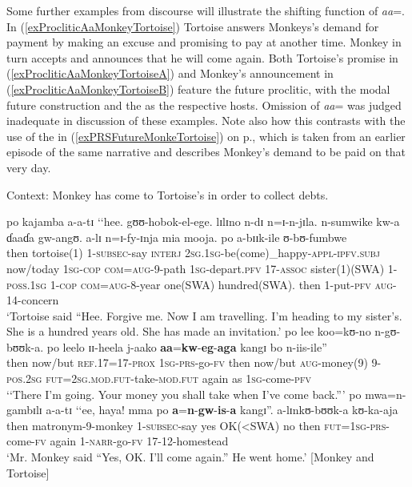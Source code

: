 Some further examples from discourse will illustrate the shifting function of \textit{aa}=. In (\ref{exProcliticAaMonkeyTortoise}) Tortoise answers Monkeys's demand for payment by making an excuse and promising to pay at another time. Monkey in turn accepts and announces that he will come again. Both Tortoise's promise in (\ref{exProcliticAaMonkeyTortoiseA}) and Monkey's announcement in (\ref{exProcliticAaMonkeyTortoiseB}) feature the future proclitic, with the modal future construction and the  as the respective hosts. Omission of \textit{aa}= was judged inadequate in discussion of these examples. Note also how this contrasts with the use of the  in (\ref{exPRSFutureMonkeTortoise}) on p.\nobreakspace\pageref{exPRSFutureMonkeTortoise}, which is taken from an earlier episode of the same narrative and describes Monkey's demand to be paid on that very day.
\begin{exe}
\ex Context: Monkey has come to Tortoise's in order to collect debts.
\label{exProcliticAaMonkeyTortoise}
\begin{xlist}
\ex \label{exProcliticAaMonkeyTortoiseA}
\gll po kajamba a-a-tɪ \textup{\lq\lq}hee. gʊʊ-hobok-el-ege. lɪlɪno n-dɪ n=ɪ-n-jɪla. n-sumwike kw-a ɗaaɗa gw-angʊ. a-lɪ n=ɪ-fy-ɪnja mia mooja. po a-bɪɪk-ile ʊ-bʊ-fumbwe\\
then tortoise(1) 1-\textsc{subsec}-say \phantom{\lq\lq}\textsc{interj} \textsc{2sg.1sg}-be(come)\_happy-\textsc{appl}-\textsc{ipfv.subj} now/today \textsc{1sg}-\textsc{cop} \textsc{com}=\textsc{aug}-9-path \textsc{1sg}-depart.\textsc{pfv} 17-\textsc{assoc} sister(1)(SWA) 1-\textsc{poss.1sg} 1-\textsc{cop} \textsc{com}=\textsc{aug}-8-year one(SWA) hundred(SWA). then 1-put-\textsc{pfv} \textsc{aug}-14-concern\\
\glt `Tortoise said ``Hee. Forgive me. Now I am travelling. I'm heading to my sister's. She is a hundred years old. She has made an invitation.'
\ex \gll po lee koo=kʊ-no n-gʊ-bʊʊk-a. po leelo ɪɪ-heela j-aako \textbf{aa}=\textbf{kw}-\textbf{eg}-\textbf{aga} kangɪ bo n-iis-ile\textup{''}\\
then now/but \textsc{ref.17}=17-\textsc{prox} \textsc{1sg}-\textsc{prs}-go-\textsc{fv} then now/but \textsc{aug}-money(9) 9-\textsc{pos.2sg} \textsc{fut}=\textsc{2sg.mod.fut}-take-\textsc{mod.fut} again as \textsc{1sg}-come-\textsc{pfv}\\
\glt  \lq\lq There I'm going. Your money you shall take when I've come back.''{}'
\ex \label{exProcliticAaMonkeyTortoiseB}
\gll po mwa=n-gambɪlɪ a-a-tɪ \textup{\lq\lq}ee, haya! mma po \textbf{a}=\textbf{n}-\textbf{gw}-\textbf{is}-\textbf{a} kangɪ\textup{''}. a-lɪnkʊ-bʊʊk-a kʊ-ka-aja\\
then matronym-9-monkey 1-\textsc{subsec}-say \phantom{\lq\lq}yes OK(<SWA) no then \textsc{fut}=\textsc{1sg}-\textsc{prs}-come-\textsc{fv} again 1-\textsc{narr}-go-\textsc{fv} 17-12-homestead\\
\glt `Mr. Monkey said ``Yes, OK. I'll come again.'' He went home.' [Monkey and Tortoise]
\end{xlist}
\end{exe}

